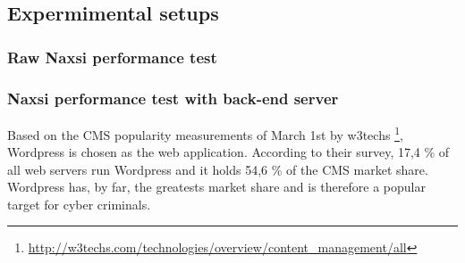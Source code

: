 \documentclass[Methods]{subfiles}
\begin{document}
\subsection{Expermimental setups}

\subsubsection{Raw Naxsi performance test}

\subsubsection{Naxsi performance test with back-end server}
Based on the \ac{CMS} popularity measurements of March 1st by w3techs \footnote{\url{http://w3techs.com/technologies/overview/content_management/all}}, Wordpress is chosen as the web application. According to their survey, 17,4 \% of all web servers run Wordpress and it holds 54,6 \% of the CMS market share. Wordpress has, by far, the greatests market share and is therefore a popular target for cyber criminals.
\end{document}
